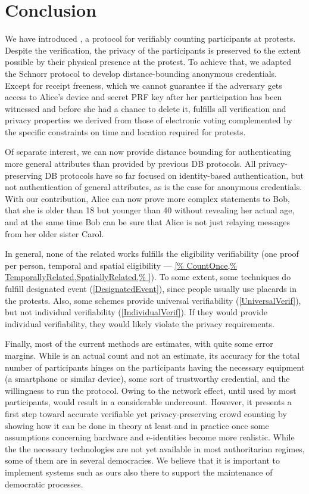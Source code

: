 \section{Conclusion}%
\label{Conclusion}

We have introduced \PRIVO, a protocol for verifiably counting participants at protests. Despite the verification, the privacy of the
participants is preserved to the extent possible by their physical
presence at the protest. To achieve that, we adapted the Schnorr
protocol to develop distance-bounding anonymous credentials. Except for receipt
freeness, which we cannot guarantee if the adversary gets access to
Alice's device and secret PRF key after her participation has
been witnessed and before she had a chance to
delete it, \PRIVO
fulfills all verification and privacy properties we derived from those
of electronic voting complemented by the specific constraints on time
and location required for protests. 

Of separate interest, we can now provide distance bounding for authenticating 
more general attributes than provided by previous \ac{DB} protocols.
All privacy-preserving \ac{DB} protocols have so far focused on identity-based 
authentication, but not authentication of general attributes, as is the case 
for anonymous credentials.
With our contribution, Alice can now prove more complex statements to Bob, \eg 
that she is older than 18 but younger than 40 without revealing her actual age,  
and at the same time Bob can be sure that Alice is not just relaying messages 
from her older sister Carol.

In general, none of the related works fulfills the eligibility
verifiability (one proof per person, temporal and spatial eligibility ---
\cref{%
  CountOnce,%
  TemporallyRelated,SpatiallyRelated,%
}).
To some extent, some techniques do fulfill designated event (\cref{DesignatedEvent}), since people 
usually use placards in the protests.
Also, some schemes provide universal verifiability (\cref{UniversalVerif}), but 
not individual verifiability (\cref{IndividualVerif}).
If they would provide individual verifiability, they would likely violate the 
privacy requirements.

Finally, most of the current methods are estimates, with quite some
error margins. While \PRIVO is an actual count and not an estimate,
its accuracy for the total number of participants hinges on the
participants having the necessary equipment (a smartphone or similar
device), some sort of trustworthy credential, and the willingness to
run the protocol. Owing to the network effect, until used by most
participants, \PRIVO would result in a considerable
undercount. However, it presents a first step toward accurate
verifiable yet privacy-preserving crowd counting by showing how it can
be done in theory at least and in practice once some assumptions
concerning hardware and e-identities become more realistic. While the
the necessary technologies are not yet available in most authoritarian
regimes, some of them are in several democracies. We believe that it
is important to implement systems such as ours also there to support
the maintenance of democratic processes.

